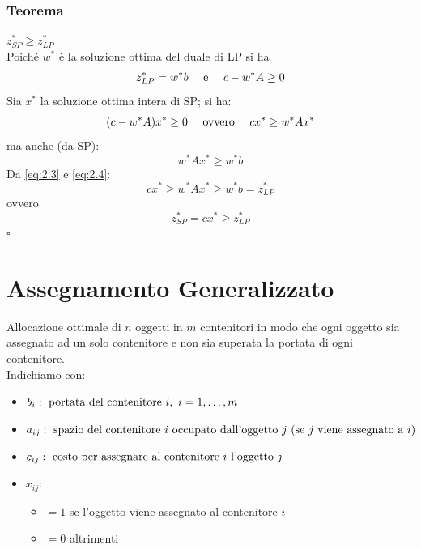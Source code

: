 \clearpage
\subsubsection{Teorema}

$z_{SP}^{*}\ge z_{LP}^{*}$\\
Poiché $w^{*}$ è la soluzione ottima del duale di LP si ha
\begin{equation*}
	z_{LP}^{*}=w^{*}b\ \ \ \textnormal{ e }\ \ \ c-w^{*}A\ge 0
\end{equation*}
Sia $x^{*}$ la soluzione ottima intera di SP; si ha:
\begin{equation}
	\label{eq:2.3}
	(c-w^{*}A)x^{*}\ge 0\ \ \ \textnormal{ ovvero }\ \ \ cx^{*}\ge w^{*}Ax^{*} 
\end{equation}
ma anche (da SP):
\begin{equation}
	\label{eq:2.4}
	w^{*}Ax^{*}\ge w^{*}b
\end{equation}
Da \ref{eq:2.3} e \ref{eq:2.4}:
\begin{equation*}
	cx^{*}\ge w^{*}Ax^{*}\ge w^{*}b=z^{*}_{LP}
\end{equation*}
ovvero
\begin{equation*}
	z^{*}_{SP}=cx^{*}\ge z_{LP}^{*}
\end{equation*}
$\square$

\section{Assegnamento Generalizzato}
Allocazione ottimale di $n$ oggetti in $m$ contenitori in modo che ogni oggetto sia assegnato ad un solo contenitore e non sia superata la portata di ogni contenitore.\\
Indichiamo con:
\begin{itemize}
	\item[] $b_{i}: \textnormal{ portata del contenitore }i,\ i=1,\dots,m$
	\item[] $a_{ij}: \textnormal{ spazio del contenitore $i$ occupato dall'oggetto $j$ (se $j$ viene assegnato a $i$)}$
	\item[] $c_{ij}: \textnormal{ costo per assegnare al contenitore $i$ l'oggetto $j$}$
	\item[] $x_{ij}$:
	\begin{itemize}
		\item[] $=1$ se l'oggetto viene assegnato al contenitore $i$
		\item[] $=0$ altrimenti
	\end{itemize}
\end{itemize}

